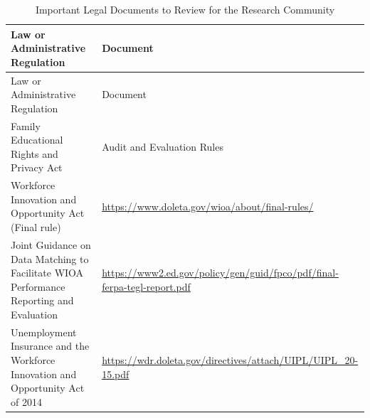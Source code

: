 \documentclass[
]{book}
\begin{document}
\begin{longtable}[]{@{}ll@{}}
\caption{\label{tab:oldatable3} Important Legal Documents to Review for the Research Community}\tabularnewline
\toprule
\begin{minipage}[b]{0.47\columnwidth}\raggedright
Law or Administrative Regulation\strut
\end{minipage} & \begin{minipage}[b]{0.47\columnwidth}\raggedright
Document\strut
\end{minipage}\tabularnewline
\midrule
\endfirsthead
\toprule
\begin{minipage}[b]{0.47\columnwidth}\raggedright
Law or Administrative Regulation\strut
\end{minipage} & \begin{minipage}[b]{0.47\columnwidth}\raggedright
Document\strut
\end{minipage}\tabularnewline
\midrule
\endhead
\begin{minipage}[t]{0.47\columnwidth}\raggedright
Family Educational Rights and Privacy Act\strut
\end{minipage} & \begin{minipage}[t]{0.47\columnwidth}\raggedright
Audit and Evaluation Rules \citep{privacytechnicalassistancecenter2017}\strut
\end{minipage}\tabularnewline
\begin{minipage}[t]{0.47\columnwidth}\raggedright
Workforce Innovation and Opportunity Act (Final rule)\strut
\end{minipage} & \begin{minipage}[t]{0.47\columnwidth}\raggedright
\url{https://www.doleta.gov/wioa/about/final-rules/}\strut
\end{minipage}\tabularnewline
\begin{minipage}[t]{0.47\columnwidth}\raggedright
Joint Guidance on Data Matching to Facilitate WIOA Performance Reporting and Evaluation\strut
\end{minipage} & \begin{minipage}[t]{0.47\columnwidth}\raggedright
\url{https://www2.ed.gov/policy/gen/guid/fpco/pdf/final-ferpa-tegl-report.pdf}\strut
\end{minipage}\tabularnewline
\begin{minipage}[t]{0.47\columnwidth}\raggedright
Unemployment Insurance and the Workforce Innovation and Opportunity Act of 2014\strut
\end{minipage} & \begin{minipage}[t]{0.47\columnwidth}\raggedright
\url{https://wdr.doleta.gov/directives/attach/UIPL/UIPL_20-15.pdf}\strut
\end{minipage}\tabularnewline
\bottomrule
\end{longtable}
\end{document}
